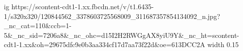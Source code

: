  
 
 
 
 

\par
\ifcmt
  ig https://scontent-cdt1-1.xx.fbcdn.net/v/t1.6435-1/s320x320/120844562_3378603725568009_311687357854134092_n.jpg?_nc_cat=110&ccb=1-5&_nc_sid=7206a8&_nc_ohc=d15I2H2RWGgAX8yiU9Y&_nc_ht=scontent-cdt1-1.xx&oh=29675dfc9e0b3aa334cf17d7aa73f22d&oe=613DCC2A
  width 0.15
\fi

